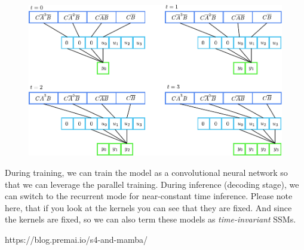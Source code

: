 \begin{figure}[h]
	\centering
	\includegraphics[scale=0.95]{./images/state_space/mamba_conv.pdf}
	\caption{}
	\label{fig:mamba_conv}
\end{figure}

During training, we can train the model as a convolutional neural network so that we can leverage the parallel training. During inference (\ie decoding stage), we can switch to the recurrent mode for near-constant time inference. Please note here, that if you look at the kernels you can see that they are fixed. And since the kernels are fixed, so we can also term these models as \textit{time-invariant} SSMs. 


https://blog.premai.io/s4-and-mamba/





